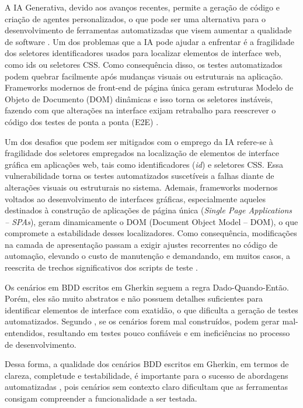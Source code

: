 A IA Generativa, devido aos avanços recentes, permite a geração de código e criação de agentes personalizados, o que pode ser uma alternativa para o desenvolvimento de ferramentas automatizadas que visem aumentar a qualidade de software \cite{Chemnitz2023, Pysmennyi2025}. Um dos problemas que a IA pode ajudar a enfrentar é a fragilidade dos seletores identificadores usados para localizar elementos de interface web, como ids ou seletores CSS. Como consequência disso, os testes automatizados podem quebrar facilmente após mudanças visuais ou estruturais na aplicação. Frameworks modernos de front-end de página única geram estruturas Modelo de Objeto de Documento (DOM) dinâmicas e isso torna os seletores instáveis, fazendo com que alterações na interface exijam retrabalho para reescrever o código dos testes de ponta a ponta (E2E) \cite{Pysmennyi2025}.

Um dos desafios que podem ser mitigados com o emprego da IA refere-se à fragilidade dos seletores empregados na localização de elementos de interface gráfica em aplicações web, tais como identificadores (\textit{id}) e seletores CSS. Essa vulnerabilidade torna os testes automatizados suscetíveis a falhas diante de alterações visuais ou estruturais no sistema. Ademais, frameworks modernos voltados ao desenvolvimento de interfaces gráficas,  especialmente aqueles destinados à construção de aplicações de página única (\textit{Single Page Applications – SPAs}), geram dinamicamente o DOM (Document Object Model – DOM), o que compromete a estabilidade desses localizadores. Como consequência, modificações na camada de apresentação passam a exigir ajustes recorrentes no código de automação, elevando o custo de manutenção e demandando, em muitos casos, a reescrita de trechos significativos dos scripts de teste \cite{Pysmennyi2025}.


Os cenários em BDD escritos em Gherkin seguem a regra Dado-Quando-Então. Porém, eles são muito abstratos e não possuem detalhes suficientes para identificar elementos de interface com exatidão, o que dificulta a geração de testes automatizados. Segundo , se os cenários forem mal construídos, podem gerar mal-entendidos, resultando em testes pouco confiáveis e em ineficiências no processo de desenvolvimento.

Dessa forma, a qualidade dos cenários BDD escritos em Gherkin, em termos de clareza, completude e testabilidade, é importante para o sucesso de abordagens automatizadas \cite{Alinezhadtilaki2025, Ferreira2025}, pois cenários sem contexto claro dificultam que as ferramentas consigam compreender a funcionalidade a ser testada.

